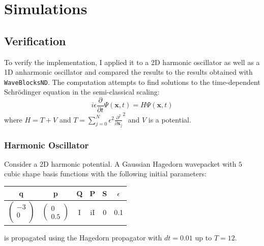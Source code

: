 
\chapter{Simulations} %

\label{Chapter4} %



\section{Verification}
To verify the implementation, I applied it to a 2D harmonic oscillator as well as a 1D anharmonic oscillator and compared the results to the results obtained with \texttt{WaveBlocksND}.
The computation attempts to find solutions to the time-dependent Schr\"odinger equation in
the semi-classical scaling:
\begin{equation}
i \epsilon \frac{\partial}{\partial t}\Psi(\mathbf{x},t) = H \Psi(\mathbf{x},t)
\end{equation}
where $H = T + V$ and $T = \sum\limits_{j=0}^N \epsilon^2 \frac{\partial^2}{\partial \mathbf{x}_j}^2$ and $V$ is a potential.

\subsection{Harmonic Oscillator}
Consider a 2D harmonic potential.
A Gaussian Hagedorn wavepacket with $5$ cubic shape basis functions with the following initial parameters:
\begin{center}
 \begin{tabular}{|c c c c c c|} 
 \hline
 q & p & Q & P & S & $\epsilon$\\ [0.5ex] 
 \hline
 $\begin{pmatrix}
 -3\\
 0\\
 \end{pmatrix}$ & $\begin{pmatrix} 0 \\ 0.5 \end{pmatrix}$ & I & iI & 0 & 0.1\\ 
 \hline
\end{tabular}
\end{center}
is propagated using the Hagedorn propagator with $dt = 0.01$ up to $T = 12$.


